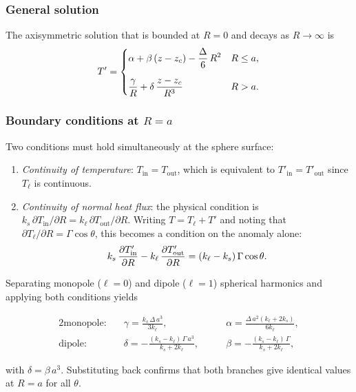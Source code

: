 \subsubsection*{General solution}

The axisymmetric solution that is bounded at $R=0$ and decays as $R\to\infty$ is
\[
    T' =
    \begin{dcases}
        \alpha + \beta\,(z - z_c) - \dfrac{\Delta}{6}\,R^2 & R \leq a, \\[6pt]
        \dfrac{\gamma}{R} + \delta\,\dfrac{z - z_c}{R^3} & R > a.
    \end{dcases}
\]

\subsubsection*{Boundary conditions at $R = a$}

Two conditions must hold simultaneously at the sphere surface:
\begin{enumerate}
    \item \emph{Continuity of temperature}: $T_{\mathrm{in}} = T_{\mathrm{out}}$, which is equivalent to $T'_{\mathrm{in}} = T'_{\mathrm{out}}$ since $T_\ell$ is continuous.
    \item \emph{Continuity of normal heat flux}: the physical condition is $k_s\,\partial T_{\mathrm{in}}/\partial R = k_\ell\,\partial T_{\mathrm{out}}/\partial R$.  Writing $T = T_\ell + T'$ and noting that $\partial T_\ell/\partial R = \Gamma \cos\theta$, this becomes a condition on the anomaly alone:
    \[
        k_s\,\pdv{T'_{\mathrm{in}}}{R}
        -
        k_\ell\,\pdv{T'_{\mathrm{out}}}{R}
        =
        (k_\ell - k_s)\,\Gamma \cos\theta.
    \]
\end{enumerate}

Separating monopole ($\ell=0$) and dipole ($\ell=1$) spherical harmonics and applying both conditions yields

\begin{alignat*}{2}
    \text{monopole:} \quad
    &\gamma = \frac{k_s\,\Delta\,a^3}{3k_\ell},
    &\qquad \alpha = \frac{\Delta\,a^2(k_\ell + 2k_s)}{6k_\ell}, \\[4pt]
    \text{dipole:} \quad
    &\delta = -\frac{(k_s - k_\ell)\,\Gamma \,a^3}{k_s + 2k_\ell},
    &\qquad \beta  = -\frac{(k_s - k_\ell)\,\Gamma}{k_s + 2k_\ell},
\end{alignat*}

with $\delta = \beta\,a^3$.  Substituting back confirms that both branches give identical values at $R = a$ for all $\theta$.

